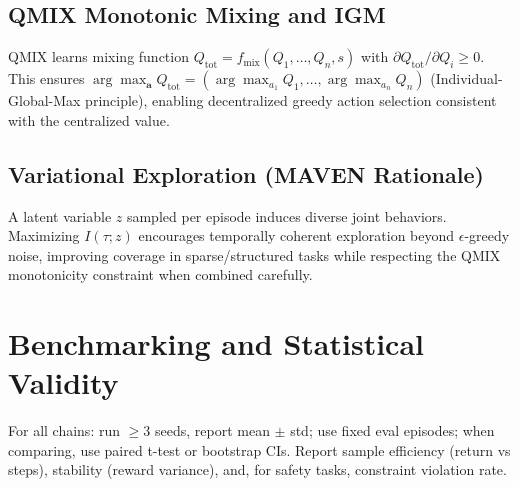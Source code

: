 \documentclass[11pt]{article}
\newcommand{\1}{\mathbf{1}}
\begin{document}
\subsection{QMIX Monotonic Mixing and IGM}
QMIX learns mixing function $Q_{\text{tot}}=f_{\text{mix}}(Q_1,\dots,Q_n,s)$ with $\partial Q_{\text{tot}}/\partial Q_i \ge 0$. This ensures $\arg\max_{\mathbf{a}} Q_{\text{tot}} = (\arg\max_{a_1} Q_1,\dots,\arg\max_{a_n} Q_n)$ (Individual-Global-Max principle), enabling decentralized greedy action selection consistent with the centralized value.

\subsection{Variational Exploration (MAVEN Rationale)}
A latent variable $z$ sampled per episode induces diverse joint behaviors. Maximizing $I(\tau; z)$ encourages temporally coherent exploration beyond $\epsilon$-greedy noise, improving coverage in sparse/structured tasks while respecting the QMIX monotonicity constraint when combined carefully.

\section{Benchmarking and Statistical Validity}
For all chains: run $\ge3$ seeds, report mean $\pm$ std; use fixed eval episodes; when comparing, use paired t-test or bootstrap CIs. Report sample efficiency (return vs steps), stability (reward variance), and, for safety tasks, constraint violation rate.
\end{document}
